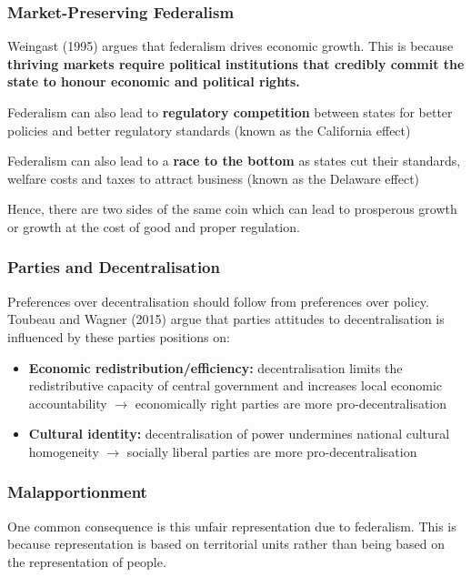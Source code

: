 \documentclass[12pt, letterpaper]{article}
\begin{document}
\subsubsection{Market-Preserving Federalism}
Weingast (1995) argues that federalism drives economic growth. This is because \textbf{thriving markets require political institutions that credibly commit the state to honour economic and political rights.}

Federalism can also lead to \textbf{regulatory competition} between states for better policies and better regulatory standards (known as the California effect)

Federalism can also lead to a \textbf{race to the bottom} as states cut their standards, welfare costs and taxes to attract business (known as the Delaware effect)

Hence, there are two sides of the same coin which can lead to prosperous growth or growth at the cost of good and proper regulation.

\subsubsection{Parties and Decentralisation}
Preferences over decentralisation should follow from preferences over policy. Toubeau and Wagner (2015) argue that parties attitudes to decentralisation is influenced by these parties positions on:
\begin{itemize}
	\item \textbf{Economic redistribution/efficiency:} decentralisation limits the redistributive capacity of central government and increases local economic accountability $\rightarrow$ economically right parties are more pro-decentralisation
	\item \textbf{Cultural identity:} decentralisation of power undermines national cultural homogeneity $\rightarrow$ socially liberal parties are more pro-decentralisation
\end{itemize}


\subsubsection{Malapportionment}
One common consequence is this unfair representation due to federalism. This is because representation is based on territorial units rather than being based on the representation of people.

\newpage
\end{document}

